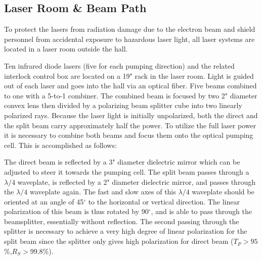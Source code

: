 {%
\subsection{Laser Room \& Beam Path}
\label{sec:las}

To protect the lasers from radiation damage due to the electron beam
and shield personnel from accidental exposure to hazardous laser
light, all laser systems are located in a laser room outside the hall.




Ten infrared diode lasers (five for each pumping direction) and 
the related interlock control box are located on a 19" rack in the laser room.
Light is guided out of each laser and 
goes into the hall via an optical fiber.  
Five beams combined to one with a 5-to-1 combiner. 
The combined beam is focused by two 2" diameter convex lens then 
divided by a polarizing
beam splitter cube into two linearly polarized rays.  Because the
laser light is initially unpolarized, both the direct and the split
beam carry approximately half the power. To utilize the full laser
power it is necessary to combine both beams and focus them onto the
optical pumping cell.  This is accomplished as follows:

The direct beam is reflected by a 3" diameter dielectric mirror which
can be adjusted to steer it towards the pumping cell.  The split beam
passes through a $\lambda/4$ waveplate, is reflected by a 2" diameter
dielectric mirror, and passes through the $\lambda/4$ waveplate again.  The 
fast and slow axes of this $\lambda/4$ waveplate should be oriented at an 
angle of 45$^\circ$ to the horizontal or vertical direction.  The
linear polarization of this beam is thus rotated by 90$^\circ$, and is
able to pass through the beamsplitter, essentially without
reflection.  The second passing through the splitter is necessary to
achieve a very high degree of linear polarization for the split beam
since the splitter only gives high polarization for direct beam 
($T_P>95$\%,$R_S>99.8$\%).

}
